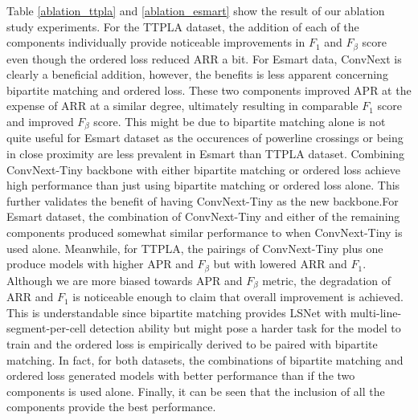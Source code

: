 \documentclass[journal]{IEEEtran}
\begin{document}
Table \ref{ablation_ttpla} and \ref{ablation_esmart} show the result of our ablation study experiments. For the TTPLA dataset, the addition of each of the components individually provide noticeable improvements in $F_1$ and $F_{\beta}$ score even though the ordered loss reduced ARR a bit. For Esmart data, ConvNext is clearly a beneficial addition, however, the benefits is less apparent concerning bipartite matching and ordered loss. These two components improved APR at the expense of ARR at a similar degree, ultimately resulting in comparable $F_1$ score and improved $F_{\beta}$ score. This might be due to bipartite matching alone is not quite useful for Esmart dataset as the occurences of powerline crossings or being in close proximity are less prevalent in Esmart than TTPLA dataset. Combining ConvNext-Tiny backbone with either bipartite matching or ordered loss achieve high performance than just using bipartite matching or ordered loss alone. This further validates the benefit of having ConvNext-Tiny as the new backbone.For Esmart dataset, the combination of ConvNext-Tiny and either of the remaining components produced somewhat similar performance to when ConvNext-Tiny is used alone. Meanwhile, for TTPLA, the pairings of ConvNext-Tiny plus one produce models with higher APR and $F_{\beta}$ but with lowered ARR and $F_1$. Although we are more biased towards APR and $F_{\beta}$ metric, the degradation of ARR and $F_1$ is noticeable enough to claim that overall improvement is achieved. This is understandable since bipartite matching provides LSNet with multi-line-segment-per-cell detection ability but might pose a harder task for the model to train and the ordered loss is empirically derived to be paired with bipartite matching. In fact, for both datasets, the combinations of bipartite matching and ordered loss generated models with better performance than if the two components is used alone. Finally, it can be seen that the inclusion of all the components provide the best performance.
\end{document}
